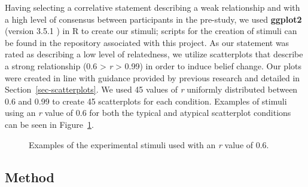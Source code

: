 \documentclass[manuscript,screen,review,anonymous]{acmart}
\begin{document}
Having selecting a correlative statement describing a weak relationship
and with a high level of consensus between participants in the
pre-study, we used \textbf{ggplot2} (version 3.5.1 \citep{ggplot}) in R
to create our stimuli; scripts for the creation of stimuli can be found
in the repository associated with this project. As our statement was
rated as describing a low level of relatedness, we utilize scatterplots
that describe a strong relationship (0.6 \textgreater{} \emph{r}
\textgreater{} 0.99) in order to induce belief change. Our plots were
created in line with guidance provided by previous research and detailed
in Section~\ref{sec-scatterplots}. We used 45 values of \emph{r}
uniformly distributed between 0.6 and 0.99 to create 45 scatterplots for
each condition. Examples of stimuli using an \emph{r} value of 0.6 for
both the typical and atypical scatterplot conditions can be seen in
Figure~\ref{fig-main-examples}.

\begin{figure}


\caption{\label{fig-main-examples}Examples of the experimental stimuli
used with an \textit{r} value of 0.6.}

\end{figure}%

\subsection{Method}\label{sec-method-main}
\end{document}
